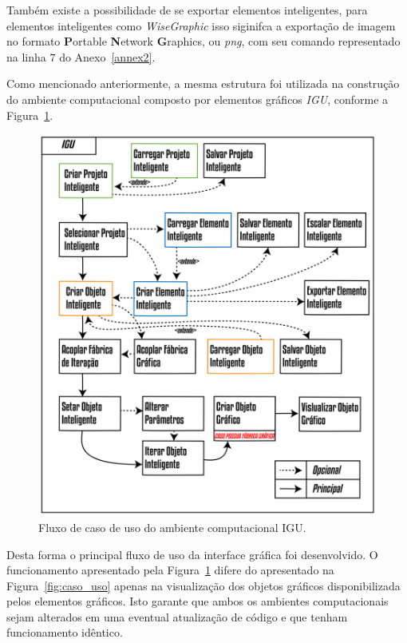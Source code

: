 Também existe a possibilidade de se exportar elementos inteligentes, para elementos inteligentes como \textit{WiseGraphic} isso siginifca a exportação de imagem no formato \textbf{P}ortable \textbf{N}etwork \textbf{G}raphics, ou \textit{png}, com seu comando representado na linha $7$ do Anexo~\ref{annex2}.

Como mencionado anteriormente, a mesma estrutura foi utilizada na construção do ambiente computacional composto por elementos gráficos \textit{IGU}, conforme a Figura~\ref{fig:caso_uso2}.

\begin{figure}[!htbp]
	\centering
	\includegraphics[width=\linewidth]{Figures/CasoDeUso2@16x.png}
	\caption{Fluxo de caso de uso do ambiente computacional IGU.}
	\label{fig:caso_uso2}
\end{figure}

 Desta forma o principal fluxo de uso da interface gráfica foi desenvolvido. O funcionamento apresentado pela Figura~\ref{fig:caso_uso2} difere do apresentado na Figura~\ref{fig:caso_uso} apenas na visualização dos objetos gráficos disponibilizada pelos elementos gráficos. Isto garante que ambos os ambientes computacionais sejam alterados em uma eventual atualização de código e que tenham funcionamento idêntico.

